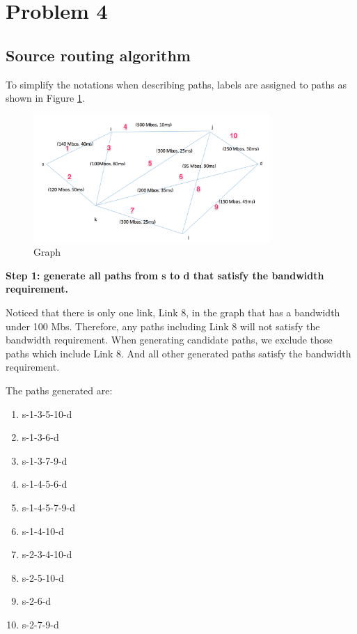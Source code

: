 \section{Problem 4}
\subsection{Source routing algorithm}

To simplify the notations when describing paths, labels are assigned to paths as shown in Figure \ref{fig:graph}.

\begin{figure}[h]
    \centering
    \includegraphics[width=0.8\textwidth]{labeled.png}
    \caption{Graph}
    \label{fig:graph}
\end{figure}

\textbf{Step 1: generate all paths from s to d that satisfy the bandwidth requirement.}

Noticed that there is only one link, Link 8, in the graph that has a bandwidth under 100 Mbs. Therefore, any paths including Link 8 will not satisfy the bandwidth requirement. When generating candidate paths, we exclude those paths which include Link 8. And all other generated paths satisfy the bandwidth requirement.

The paths generated are:
\begin{enumerate}
\item s-1-3-5-10-d
\item s-1-3-6-d
\item s-1-3-7-9-d
\item s-1-4-5-6-d
\item s-1-4-5-7-9-d
\item s-1-4-10-d
\item s-2-3-4-10-d
\item s-2-5-10-d
\item s-2-6-d
\item s-2-7-9-d
\end{enumerate}

